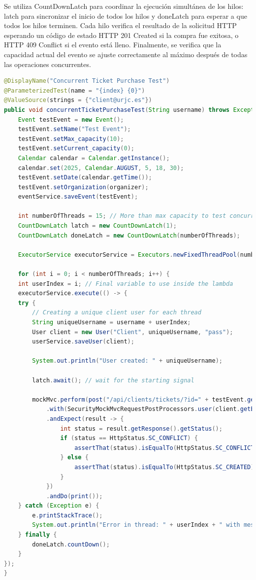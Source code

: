 Se utiliza CountDownLatch para coordinar la ejecución simultánea de los hilos: latch para sincronizar el inicio de todos los hilos y doneLatch para esperar a que todos los
hilos terminen. Cada hilo verifica el resultado de la solicitud HTTP esperando un código de estado HTTP 201 Created si la compra fue exitosa, o HTTP 409 Conflict si el evento
está lleno. Finalmente, se verifica que la capacidad actual del evento se ajuste correctamente al máximo después de todas las operaciones concurrentes.

\myjavastyle
\begin{lstlisting}[language=Java, caption=Función buyTicket, label=lst:testConcurrencia]
@DisplayName("Concurrent Ticket Purchase Test")
@ParameterizedTest(name = "{index} {0}")
@ValueSource(strings = {"client@urjc.es"})
public void concurrentTicketPurchaseTest(String username) throws Exception {
    Event testEvent = new Event();
    testEvent.setName("Test Event");
    testEvent.setMax_capacity(10);
    testEvent.setCurrent_capacity(0);
    Calendar calendar = Calendar.getInstance();
    calendar.set(2025, Calendar.AUGUST, 5, 18, 30);
    testEvent.setDate(calendar.getTime());
    testEvent.setOrganization(organizer);
    eventService.saveEvent(testEvent);

    int numberOfThreads = 15; // More than max capacity to test concurrency issues
    CountDownLatch latch = new CountDownLatch(1);
    CountDownLatch doneLatch = new CountDownLatch(numberOfThreads);

    ExecutorService executorService = Executors.newFixedThreadPool(numberOfThreads);

    for (int i = 0; i < numberOfThreads; i++) {
    int userIndex = i; // Final variable to use inside the lambda
    executorService.execute(() -> {
    try {
        // Creating a unique client user for each thread
        String uniqueUsername = username + userIndex;
        User client = new User("Client", uniqueUsername, "pass");
        userService.saveUser(client);

        System.out.println("User created: " + uniqueUsername);

        latch.await(); // wait for the starting signal

        mockMvc.perform(post("/api/clients/tickets/?id=" + testEvent.getId())
            .with(SecurityMockMvcRequestPostProcessors.user(client.getEmail()).password("pass"))) // Simulating authenticated user
            .andExpect(result -> {
                int status = result.getResponse().getStatus();
                if (status == HttpStatus.SC_CONFLICT) {
                    assertThat(status).isEqualTo(HttpStatus.SC_CONFLICT);
                } else {
                    assertThat(status).isEqualTo(HttpStatus.SC_CREATED);
                }
            })
            .andDo(print());
    } catch (Exception e) {
        e.printStackTrace();
        System.out.println("Error in thread: " + userIndex + " with message: " + e.getMessage());
    } finally {
        doneLatch.countDown();
    }
});
}


\end{lstlisting}
